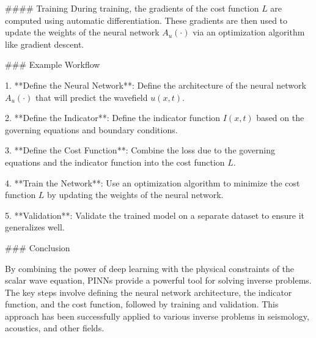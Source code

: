 #### Training
During training, the gradients of the cost function \( L \) are computed using automatic differentiation. These gradients are then used to update the weights of the neural network \( A_u(\cdot) \) via an optimization algorithm like gradient descent.

### Example Workflow

1. **Define the Neural Network**: Define the architecture of the neural network \( A_u(\cdot) \) that will predict the wavefield \( u(x, t) \).

2. **Define the Indicator**: Define the indicator function \( I(x, t) \) based on the governing equations and boundary conditions.

3. **Define the Cost Function**: Combine the loss due to the governing equations and the indicator function into the cost function \( L \).

4. **Train the Network**: Use an optimization algorithm to minimize the cost function \( L \) by updating the weights of the neural network.

5. **Validation**: Validate the trained model on a separate dataset to ensure it generalizes well.

### Conclusion

By combining the power of deep learning with the physical constraints of the scalar wave equation, PINNs provide a powerful tool for solving inverse problems. The key steps involve defining the neural network architecture, the indicator function, and the cost function, followed by training and validation. This approach has been successfully applied to various inverse problems in seismology, acoustics, and other fields.